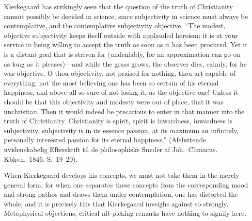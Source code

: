 \documentclass[12pt]{book}
\newcommand{\opage}[1]{\marginnote{\footnotesize\textit{[#1]}}}
\begin{document}
Kierkegaard has strikingly seen that the question of the truth of
Christianity cannot possibly be decided in science, since subjectivity
in science must always be contemplative, and the contemplative
subjectivity objective. ``The modest, objective subjectivity keeps
itself outside with applauded heroism; it is at your service in being
willing to accept the truth as soon as it has been procured. Yet it is
a distant goal that is striven for (undeniably, for an approximation
can go on as long as it pleases)---and while the grass grows, the
observer dies, calmly, for he was objective. O thou objectivity, not
praised for nothing, thou art capable of everything; not the most
believing one has been so certain of his eternal happiness, and above
all so sure of not losing it, as the objective one! Unless it should be
that this objectivity and modesty were out of place, that it was
unchristian. Then it would indeed be precarious to enter in that manner
into the truth of Christianity. Christianity is spirit, spirit is
inwardness, inwardness is subjectivity, subjectivity is in its essence
passion, at its maximum an infinitely, personally interested passion for
its eternal happiness.'' (Afsluttende uvidenskabelig Efterskrift til de
philosophiske Smuler af Joh.\ Climacus. Kbhvn.\ 1846. S.~19--20).

\opage{234}\setcounter{footnote}{0}%
When Kierkegaard develops his concepts, we must not take them in the
merely general form; for when one separates these concepts from the
corresponding mood and strong pathos and draws them under contemplation,
one has distorted the whole, and it is precisely this that Kierkegaard
inveighs against so strongly. Metaphysical objections, critical
nit-picking remarks have nothing to signify here.
\end{document}
